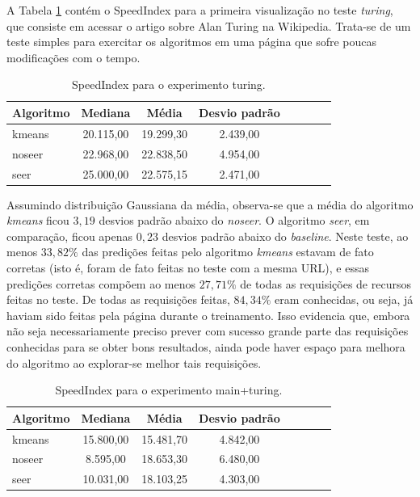 \documentclass[10pt,twocolumn,letterpaper]{article}
\begin{document}
A Tabela \ref{tbl-turing} contém o SpeedIndex para a primeira visualização no teste \emph{turing}, que consiste em acessar o artigo sobre Alan Turing na Wikipedia. Trata-se de um teste simples para exercitar os algoritmos em uma página que sofre poucas modificações com o tempo.

\begin{table}
\begin{center}
\begin{tabular}{l*{6}{c}r}
\hline
Algoritmo & Mediana & Média & Desvio padrão \\
\hline
kmeans & 20.115,00 & 19.299,30  & 2.439,00 \\
noseer & 22.968,00 & 22.838,50 & 4.954,00 \\
seer & 25.000,00 & 22.575,15 & 2.471,00 \\
\hline
\end{tabular}
\end{center}
\caption{SpeedIndex para o experimento turing.}
\label{tbl-turing}
\end{table}

Assumindo distribuição Gaussiana da média, observa-se que a média do algoritmo \emph{kmeans} ficou $3,19$ desvios padrão abaixo do \emph{noseer}. O algoritmo \emph{seer}, em comparação, ficou apenas $0,23$ desvios padrão abaixo do \emph{baseline}. Neste teste, ao menos $33,82 \%$ das predições feitas pelo algoritmo \emph{kmeans} estavam de fato corretas (isto é, foram de fato feitas no teste com a mesma URL), e essas predições corretas compõem ao menos $27,71 \%$ de todas as requisições de recursos feitas no teste. De todas as requisições feitas, $84,34 \%$ eram conhecidas, ou seja, já haviam sido feitas pela página durante o treinamento. Isso evidencia que, embora não seja necessariamente preciso prever com sucesso grande parte das requisições conhecidas para se obter bons resultados, ainda pode haver espaço para melhora do algoritmo ao explorar-se melhor tais requisições.

\begin{table}
\begin{center}
\begin{tabular}{l*{6}{c}r}
\hline
Algoritmo & Mediana & Média & Desvio padrão \\
\hline
kmeans & 15.800,00 & 15.481,70 & 4.842,00 \\
noseer & 8.595,00 & 18.653,30 & 6.480,00 \\
seer & 10.031,00 & 18.103,25 & 4.303,00 \\
\hline
\end{tabular}
\end{center}
\caption{SpeedIndex para o experimento main+turing.}
\label{tbl-main-turing}
\end{table}
\end{document}
